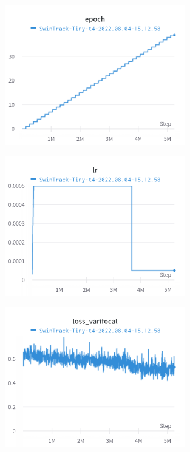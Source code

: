  \begin{figure}[H]
 	\centerline{\includegraphics[width=0.7\textwidth]{charts/Section-2-Panel-6-m8q6253z0}}
 	\caption{
 		}
 	\label{chart:epoch1}
 \end{figure}
  \begin{figure}[H]
 	\centerline{\includegraphics[width=0.7\textwidth]{charts/Section-2-Panel-12-bzoemlec5}}
 	\caption{
 		}
 	\label{chart:lr1}
 \end{figure}

\begin{figure}[H]
	\centerline{\includegraphics[width=0.7\textwidth]{charts/Section-2-Panel-9-8yjlirrqx}}
	\caption{
	}
	\label{chart:loss_varifocal1}
\end{figure}

